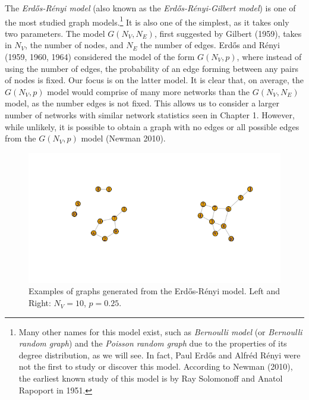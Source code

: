 \documentclass[12pt,twoside]{amherstthesis}
\begin{document}
  The \emph{Erdős-Rényi model} (also known as the
  \emph{Erdős-Rényi-Gilbert model}) is one of the most studied graph
  models.\footnote{Many other names for this model exist, such as
    \emph{Bernoulli model} (or \emph{Bernoulli random graph}) and the
    \emph{Poisson random graph} due to the properties of its degree
    distribution, as we will see. In fact, Paul Erdős and Alfréd Rényi
    were not the first to study or discover this model. According to
    Newman (2010), the earliest known study of this model is by Ray
    Solomonoff and Anatol Rapoport in 1951.} It is also one of the
  simplest, as it takes only two parameters. The model \(G(N_V, N_E)\),
  first suggested by Gilbert (1959), takes in \(N_V\), the number of
  nodes, and \(N_E\) the number of edges. Erdős and Rényi (1959, 1960,
  1964) considered the model of the form \(G(N_{V}, p)\), where instead of
  using the number of edges, the probability of an edge forming between
  any pairs of nodes is fixed. Our focus is on the latter model. It is
  clear that, on average, the \(G(N_{V}, p)\) model would comprise of many
  more networks than the \(G(N_V, N_E)\) model, as the number edges is not
  fixed. This allows us to consider a larger number of networks with
  similar network statistics seen in Chapter 1. However, while unlikely,
  it is possible to obtain a graph with no edges or all possible edges
  from the \(G(N_{V}, p)\) model (Newman 2010).
  
  \begin{figure}[htbp]
  \centering
  \includegraphics{figure/21erdosrenyiexample.png}
  \caption{Examples of graphs generated from the Erdős-Rényi model. Left
  and Right: \(N_V = 10\), \(p = 0.25\).}
  \end{figure}
  
\end{document}
